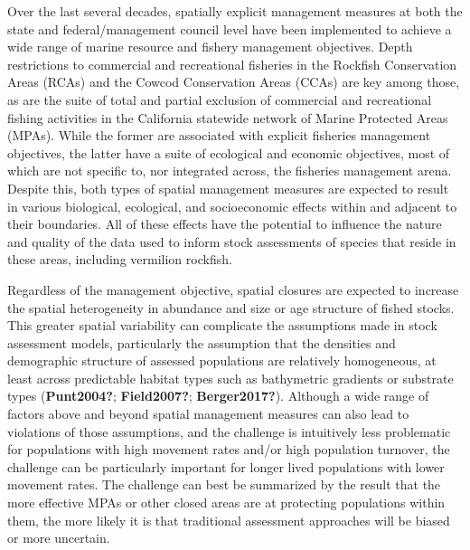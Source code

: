 \documentclass[
  english,
  a4paper,
]{article}
\begin{document}
Over the last several decades, spatially explicit management measures at both the state and federal/management council level have been implemented to achieve a wide range of marine resource and fishery management objectives. Depth restrictions to commercial and recreational fisheries in the Rockfish Conservation Areas (RCAs) and the Cowcod Conservation Areas (CCAs) are key among those, as are the suite of total and partial exclusion of commercial and recreational fishing activities in the California statewide network of Marine Protected Areas (MPAs). While the former are associated with explicit fisheries management objectives, the latter have a suite of ecological and economic objectives, most of which are not specific to, nor integrated across, the fisheries management arena. Despite this, both types of spatial management measures are expected to result in various biological, ecological, and socioeconomic effects within and adjacent to their boundaries. All of these effects have the potential to influence the nature and quality of the data used to inform stock assessments of species that reside in these areas, including vermilion rockfish.

Regardless of the management objective, spatial closures are expected to increase the spatial heterogeneity in abundance and size or age structure of fished stocks. This greater spatial variability can complicate the assumptions made in stock assessment models, particularly the assumption that the densities and demographic structure of assessed populations are relatively homogeneous, at least across predictable habitat types such as bathymetric gradients or substrate types (\textbf{Punt2004?}; \textbf{Field2007?}; \textbf{Berger2017?}). Although a wide range of factors above and beyond spatial management measures can also lead to violations of those assumptions, and the challenge is intuitively less problematic for populations with high movement rates and/or high population turnover, the challenge can be particularly important for longer lived populations with lower movement rates. The challenge can best be summarized by the result that the more effective MPAs or other closed areas are at protecting populations within them, the more likely it is that traditional assessment approaches will be biased or more uncertain.
\end{document}

